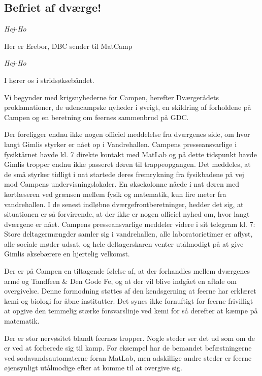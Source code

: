 \begin{minipage}[t]{170mm}
\vspace{3mm}
\begin{center}
\section*{Befriet af dværge!}
\end{center}

\emph{Hej-Ho}

Her er Erebor, DBC sender til MatCamp 

\emph{Hej-Ho}

I hører os i stridsøksebåndet. 

Vi begynder med krigsnyhederne for Campen, herefter Dværgerådets proklamationer, de udencampske nyheder i øvrigt, en skildring af forholdene på Campen og en beretning om feernes sammenbrud på GDC.

Der foreligger endnu ikke nogen officiel meddelelse fra dværgenes side, om hvor langt Gimlis styrker er nået op i Vandrehallen. Campens presseansvarlige i fysiktårnet havde kl. 7 direkte kontakt med MatLab og på dette tidspunkt havde Gimlis tropper endnu ikke passeret døren til trappeopgangen. Det meddeles, at de små styrker tidligt i nat startede deres fremrykning fra fysikbadene på vej mod Campens undervisningslokaler. En øksekolonne nåede i nat døren med kortlæseren ved grænsen mellem fysik og matematik, kun fire meter fra vandrehallen. I de senest indløbne dværgefrontberetninger, hedder det sig, at situationen er så forvirrende, at der ikke er nogen officiel nyhed om, hvor langt dværgene er nået. Campens presseansvarlige meddeler videre i sit telegram kl. 7: Store deltagermængder samler sig i vandrehallen, alle laboratorietimer er aflyst, alle sociale møder udsat, og hele deltagerskaren venter utålmodigt på at give Gimlis øksebærere en hjertelig velkomst.

Der er på Campen en tiltagende følelse af, at der forhandles mellem dværgenes armé og Tandfeen \& Den Gode Fe, og at der vil blive indgået en aftale om overgivelse. Denne formodning støttes af den kendsgerning at feerne har erklæret kemi og biologi for åbne institutter. Det synes ikke fornuftigt for feerne frivilligt at opgive den temmelig stærke forsvarslinje ved kemi for så derefter at kæmpe på matematik.

Der er stor nervøsitet blandt feernes tropper. Nogle steder ser det ud som om de er ved at forberede sig til kamp. For eksempel har de bemandet befæstningerne ved sodavandsautomaterne foran MatLab, men adskillige andre steder er feerne øjensynligt utålmodige efter at komme til at overgive sig. 


\end{minipage}
